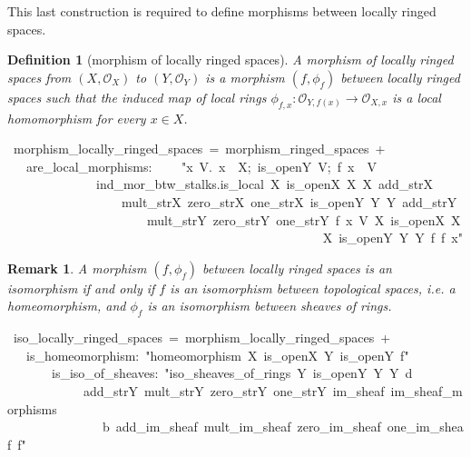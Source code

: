 \documentclass[12pt]{scrartcl}
\newtheorem{definition}[proposition]{Definition}
\newtheorem{remark}[proposition]{Remark}
\begin{document}
This last construction is required to define morphisms between locally ringed spaces.
			
\begin{definition}[morphism of locally ringed spaces]
	A morphism of locally ringed spaces from $(X, \mathscr{O}_X)$ to $(Y, \mathscr{O}_Y)$ is a morphism $(f, \phi_f)$ between locally ringed spaces such that the induced map of local rings $\phi_{f, x}: \mathscr{O}_{Y, f(x)} \rightarrow \mathscr{O}_{X, x}$ is a local homomorphism for every $x \in X$.  
\end{definition}

\begin{isabelle}
\ morphism\_locally\_ringed\_spaces\ =\ morphism\_ringed\_spaces\ +\isanewline
\ \ \ are\_local\_morphisms:\isanewline
\ \ \ \ "\isasymAnd x\ V.\ \isasymlbrakk x\ \isasymin \ X;\ is\_open\isactrlsub Y\ V;\ f\ x\ \isasymin \ V\isasymrbrakk \ \isasymLongrightarrow \ \isanewline
\ \ \ \ \ \ \ \ \ \ \ \ \ \ ind\_mor\_btw\_stalks.is\_local\ X\ is\_open\isactrlsub X\ \isasymO \isactrlsub X\ \isasymrho \isactrlsub X\ add\_str\isactrlsub X\ \isanewline
\ \ \ \ \ \ \ \ \ \ \ \ \ \ \ \ \ \ mult\_str\isactrlsub X\ zero\_str\isactrlsub X\ one\_str\isactrlsub X\ is\_open\isactrlsub Y\ \isasymO \isactrlsub Y\ \isasymrho \isactrlsub Y\ add\_str\isactrlsub Y\ \isanewline
\ \ \ \ \ \ \ \ \ \ \ \ \ \ \ \ \ \ \ \ \ \ mult\_str\isactrlsub Y\ zero\_str\isactrlsub Y\ one\_str\isactrlsub Y\ f\ x\ V\ \isasymphi \isactrlbsub X\ is\_open\isactrlsub X\ \isasymO \isactrlsub X\ \isanewline
\ \ \ \ \ \ \ \ \ \ \ \ \ \ \ \ \ \ \ \ \ \ \ \ \ \ \ \ \ \ \ \ \ \ \ \ \ \ \ \ \ \ \ \ \ \ \ \ \isasymrho \isactrlsub X\ is\_open\isactrlsub Y\ \isasymO \isactrlsub Y\ \isasymrho \isactrlsub Y\ f\ \isasymphi \isactrlsub f\ x\isactrlesub "
\end{isabelle}

\begin{remark}
	A morphism $(f, \phi_f)$ between locally ringed spaces is an isomorphism if and only if $f$ is an isomorphism between topological spaces, \textit{i.e.} a homeomorphism, and $\phi_f$ is an isomorphism between sheaves of rings.
\end{remark}

\begin{isabelle}
\ iso\_locally\_ringed\_spaces\ =\ morphism\_locally\_ringed\_spaces\ +\isanewline
\ \ \ is\_homeomorphism:\ "homeomorphism\ X\ is\_open\isactrlsub X\ Y\ is\_open\isactrlsub Y\ f"\ \isanewline
\ \ \ \ \ \ \ is\_iso\_of\_sheaves:\ "iso\_sheaves\_of\_rings\ Y\ is\_open\isactrlsub Y\ \isasymO \isactrlsub Y\ \isasymrho \isactrlsub Y\ d\ \isanewline
\ \ \ \ \ \ \ \ \ \ \ \ add\_str\isactrlsub Y\ mult\_str\isactrlsub Y\ zero\_str\isactrlsub Y\ one\_str\isactrlsub Y\ im\_sheaf\ im\_sheaf\_morphisms\isanewline
\ \ \ \ \ \ \ \ \ \ \ \ \ \ \ b\ add\_im\_sheaf\ mult\_im\_sheaf\ zero\_im\_sheaf\ one\_im\_sheaf\ \isasymphi \isactrlsub f"
\end{isabelle}
\end{document}

